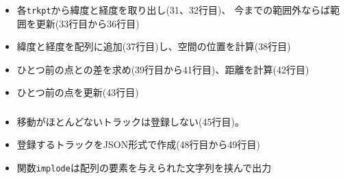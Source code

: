\begin{frame}[containsverbatim]
 \frametitle{}
\end{frame}
\begin{frame}[containsverbatim]
 \frametitle{}
 \begin{itemize}
  \item 各\texttt{trkpt}から緯度と経度を取り出し(31、32行目)、
  今までの範囲外ならば範囲を更新(33行目から36行目)
  \item 緯度と経度を配列に追加(37行目)し、空間の位置を計算(38行目)
  \item ひとつ前の点との差を求め(39行目から41行目)、距離を計算(42行目)
  \item ひとつ前の点を更新(43行目)
 \end{itemize}
\end{frame}
\begin{frame}[containsverbatim]
 \frametitle{}
  \begin{itemize}
  \item 移動がほとんどないトラックは登録しない(45行目)。
  \item 登録するトラックをJSON形式で作成(48行目から49行目)
  \item 関数\texttt{implode}は配列の要素を与えられた文字列を挟んで出力
  \end{itemize}
\end{frame}

